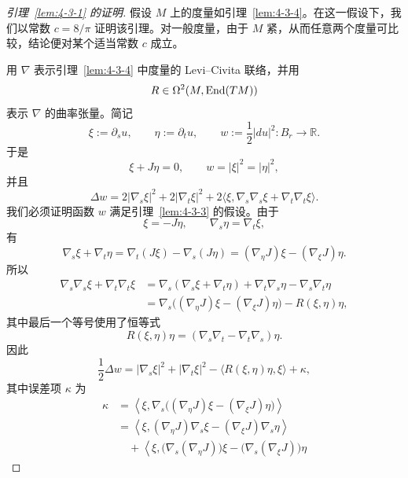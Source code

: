 \begin{proof}[引理~\ref{lem:4-3-1} 的证明]
假设 $M$ 上的度量如引理~\ref{lem:4-3-4}。在这一假设下，我们以常数 $c=8/\pi$
证明该引理。对一般度量，由于 $M$ 紧，从而任意两个度量可比较，结论便对某个适当常数
$c$ 成立。

用 $\nabla$ 表示引理~\ref{lem:4-3-4} 中度量的 Levi--Civita 联络，并用
\[
  R\in\Omega^2(M,\operatorname{End}(TM))
\]
表示 $\nabla$ 的曲率张量。简记
\[
  \xi:=\partial_su,
  \qquad
  \eta:=\partial_tu,
  \qquad
  w:=\frac12|du|^2:B_r\longrightarrow\mathbb R.
\]
于是
\[
  \xi+J\eta=0,
  \qquad
  w=|\xi|^2=|\eta|^2,
\]
并且
\begin{equation}\label{eq:4-3-6}
  \Delta w
  =
  2|\nabla_s\xi|^2
  +2|\nabla_t\xi|^2
  +2\langle\xi,\nabla_s\nabla_s\xi+\nabla_t\nabla_t\xi\rangle.
\end{equation}
我们必须证明函数 $w$ 满足引理~\ref{lem:4-3-3} 的假设。由于
\[
  \xi=-J\eta,
  \qquad
  \nabla_s\eta=\nabla_t\xi,
\]
有
\begin{equation}\label{eq:4-3-7}
  \nabla_s\xi+\nabla_t\eta
  =
  \nabla_t(J\xi)-\nabla_s(J\eta)
  =
  (\nabla_\eta J)\xi-(\nabla_\xi J)\eta.
\end{equation}
所以
\[
\begin{aligned}
  \nabla_s\nabla_s\xi+\nabla_t\nabla_t\xi
  &=
  \nabla_s(\nabla_s\xi+\nabla_t\eta)
  +\nabla_t\nabla_s\eta-\nabla_s\nabla_t\eta\\
  &=
  \nabla_s\bigl((\nabla_\eta J)\xi-(\nabla_\xi J)\eta\bigr)
  -R(\xi,\eta)\eta,
\end{aligned}
\]
其中最后一个等号使用了恒等式
\[
  R(\xi,\eta)\eta
  =(\nabla_s\nabla_t-\nabla_t\nabla_s)\eta.
\]
因此
\begin{equation}\label{eq:4-3-8}
  \frac12\Delta w
  =
  |\nabla_s\xi|^2+|\nabla_t\xi|^2
  -\langle R(\xi,\eta)\eta,\xi\rangle
  +\kappa,
\end{equation}
其中误差项 $\kappa$ 为
\[
\begin{aligned}
  \kappa
  &=
  \left\langle
    \xi,
    \nabla_s\bigl((\nabla_\eta J)\xi-(\nabla_\xi J)\eta\bigr)
  \right\rangle\\
  &=
  \left\langle
    \xi,
    (\nabla_\eta J)\nabla_s\xi-(\nabla_\xi J)\nabla_s\eta
  \right\rangle\\
  &\quad+
  \left\langle
    \xi,
    \bigl(\nabla_s(\nabla_\eta J)\bigr)\xi
    -\bigl(\nabla_s(\nabla_\xi J)\bigr)\eta

\end{aligned}\]
\end{proof}
